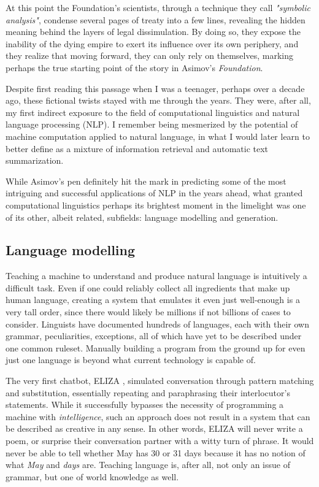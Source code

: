 At this point the Foundation's scientists, through a technique they call \emph{"symbolic analysis"}, condense several pages of treaty into a few lines, revealing the hidden meaning behind the layers of legal dissimulation.
By doing so, they expose the inability of the dying empire to exert its influence over its own periphery, and they realize that moving forward, they can only rely on themselves, marking perhaps the true starting point of the story in Asimov's \emph{Foundation}.

Despite first reading this passage when I was a teenager, perhaps over a decade ago, these fictional twists stayed with me through the years.
They were, after all, my first indirect exposure to the field of computational linguistics and natural language processing (NLP).
I remember being mesmerized by the potential of machine computation applied to natural language, in what I would later learn to better define as a mixture of information retrieval and automatic text summarization.

While Asimov's pen definitely hit the mark in predicting some of the most intriguing and successful applications of NLP in the years ahead, what granted computational linguistics perhaps its brightest moment in the limelight was one of its other, albeit related, subfields: language modelling and generation.

\subsection{Language modelling}

Teaching a machine to understand and produce natural language is intuitively a difficult task.
Even if one could reliably collect all ingredients that make up human language, creating a system that emulates it even just well-enough is a very tall order, since there would likely be millions if not billions of cases to consider.
Linguists have documented hundreds of languages, each with their own grammar, peculiarities, exceptions, all of which have yet to be described under one common ruleset.
Manually building a program from the ground up for even just one language is beyond what current technology is capable of.

The very first chatbot, ELIZA \citep{citationneeded}, simulated conversation through pattern matching and substitution, essentially repeating and paraphrasing their interlocutor's statements.
While it successfully bypasses the necessity of programming a machine with \emph{intelligence}, such an approach does not result in a system that can be described as creative in any sense.
In other words, ELIZA will never write a poem, or surprise their conversation partner with a witty turn of phrase.
It would never be able to tell whether May has 30 or 31 days because it has no notion of what \emph{May} and \emph{days} are.
Teaching language is, after all, not only an issue of grammar, but one of world knowledge as well.

